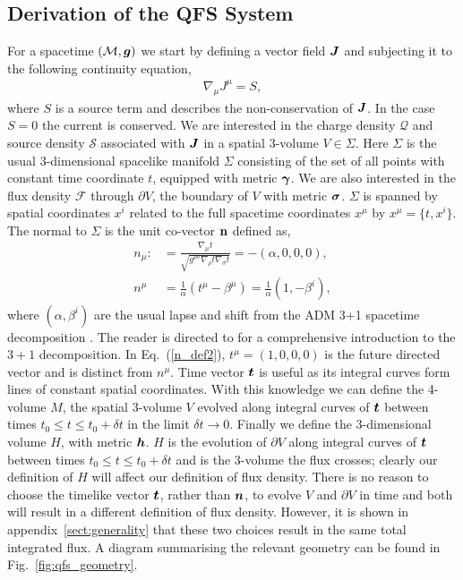 \subsection{Derivation of the QFS System} \label{sect:derive}
For a spacetime $(\mathcal{M},\boldsymbol{g})$ we start by defining a vector field $\boldsymbol{J}$ and subjecting it to the following continuity equation,
\begin{align}
\label{continuity_eqn_def}\nabla_\mu J^\mu = S,
\end{align}
where $S$ is a source term and describes the non-conservation of $\boldsymbol{J}$. In the case $S=0$ the current is conserved. We are interested in the charge density $\mathcal{Q}$ and source density $\mathcal{S}$ associated with $\boldsymbol{J}$ in a spatial 3-volume $V\in\Sigma$. Here $\Sigma$ is the usual 3-dimensional spacelike manifold $\Sigma$ consisting of the set of all points with constant time coordinate $t$, equipped with metric $\boldsymbol{\gamma}$. We are also interested in the flux density $\mathcal{F}$ through $\partial V$, the boundary of $V$ with metric $\boldsymbol{\sigma}$. $\Sigma$ is spanned by spatial coordinates $x^i$ related to the full spacetime coordinates $x^\mu$ by $ x^\mu = \{t,x^i \}$. The normal to $\Sigma$ is the unit co-vector $\bf{n}$ defined as, 
\begin{align}
\label{n_def}
n_\mu :&= \frac{\nabla_\mu t}{\sqrt{g^{\rho\sigma}\nabla_\rho t \nabla_\sigma t}} = -(\alpha,0,0,0), \\
\label{n_def2} n^\mu &= \frac{1}{\alpha}\left(t^\mu - \beta^\mu \right)= \frac{1}{\alpha} (1, -\beta^i ) , 
\end{align} 
where $(\alpha,\beta^i)$ are the usual lapse and shift from the ADM 3+1 spacetime decomposition \cite{2008}. The reader is directed to \cite{gourgoulhon20073+} for a comprehensive introduction to the $3+1$ decomposition. In Eq.~(\ref{n_def2}), $t^\mu = (1,0,0,0)$ is the future directed vector and is distinct from $n^\mu$. Time vector $\boldsymbol{t}$ is useful as its integral curves form lines of constant spatial coordinates. With this knowledge we can define the 4-volume $M$, the spatial 3-volume $V$ evolved along integral curves of $\boldsymbol{t}$ between times $t_0\leq t\leq t_0 + \delta t$ in the limit $\delta t\rightarrow 0$. Finally we define the 3-dimensional volume $H$, with metric $\boldsymbol h$. $H$ is the evolution of $\partial V$ along integral curves of $\boldsymbol{t}$ between times $t_0\leq t \leq t_0 + \delta t$ and is the 3-volume the flux crosses; clearly our definition of $H$ will affect our definition of flux density. There is no reason to choose the timelike vector $\boldsymbol{t}$, rather than $\boldsymbol{n}$, to evolve $V$ and $\partial V$ in time and both will result in a different definition of flux density. However, it is shown in appendix~\ref{sect:generality} that these two choices result in the same total integrated flux. A diagram summarising the relevant geometry can be found in Fig.~\ref{fig:qfs_geometry}.

